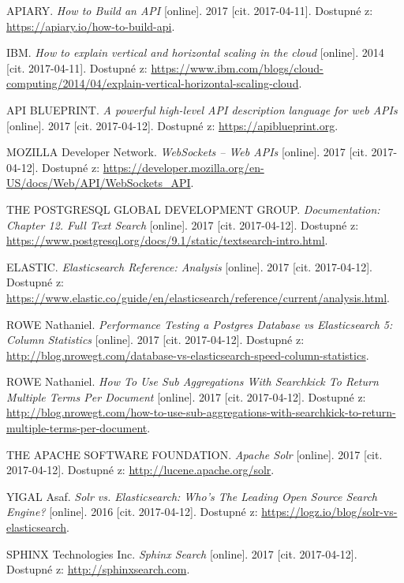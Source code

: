 \documentclass[FM,DP]{tulthesis}
\begin{document}
\begin{thebibliography}{Mm99}
 APIARY. \emph{How to Build an API} [online].
2017 [cit. 2017-04-11]. Dostupné z: \url{https://apiary.io/how-to-build-api}.

 IBM. \emph{How to explain vertical and horizontal scaling in the cloud} [online].
2014 [cit. 2017-04-11]. Dostupné z: 
\url{https://www.ibm.com/blogs/cloud-computing/2014/04/explain-vertical-horizontal-scaling-cloud}.

 API BLUEPRINT. \emph{A powerful high-level API description language for web APIs} [online].
2017 [cit. 2017-04-12]. Dostupné z: \url{https://apiblueprint.org}.

 MOZILLA Developer Network. \emph{WebSockets -- Web APIs} [online].
2017 [cit. 2017-04-12]. Dostupné z: \url{https://developer.mozilla.org/en-US/docs/Web/API/WebSockets_API}.

 THE POSTGRESQL GLOBAL DEVELOPMENT GROUP. 
\emph{Documentation: Chapter 12. Full Text Search} [online].
2017 [cit. 2017-04-12]. Dostupné z: \url{https://www.postgresql.org/docs/9.1/static/textsearch-intro.html}.

 ELASTIC. \emph{Elasticsearch Reference: Analysis} [online].
2017 [cit. 2017-04-12]. Dostupné z: \url{https://www.elastic.co/guide/en/elasticsearch/reference/current/analysis.html}.

 ROWE Nathaniel. 
\emph{Performance Testing a Postgres Database vs Elasticsearch 5: Column Statistics} [online].
2017 [cit. 2017-04-12]. Dostupné z: \url{http://blog.nrowegt.com/database-vs-elasticsearch-speed-column-statistics}.

 ROWE Nathaniel. 
\emph{How To Use Sub Aggregations With Searchkick To Return Multiple Terms Per Document} [online].
2017 [cit. 2017-04-12]. Dostupné z: 
\url{http://blog.nrowegt.com/how-to-use-sub-aggregations-with-searchkick-to-return-multiple-terms-per-document}.

 THE APACHE SOFTWARE FOUNDATION. \emph{Apache Solr} [online].
2017 [cit. 2017-04-12]. Dostupné z: \url{http://lucene.apache.org/solr}.

 YIGAL Asaf. \emph{Solr vs. Elasticsearch: Who’s The Leading Open Source Search Engine?} [online].
2016 [cit. 2017-04-12]. Dostupné z: \url{https://logz.io/blog/solr-vs-elasticsearch}.

 SPHINX Technologies Inc. \emph{Sphinx Search} [online].
2017 [cit. 2017-04-12]. Dostupné z: \url{http://sphinxsearch.com}.


\end{thebibliography}
\end{document}
